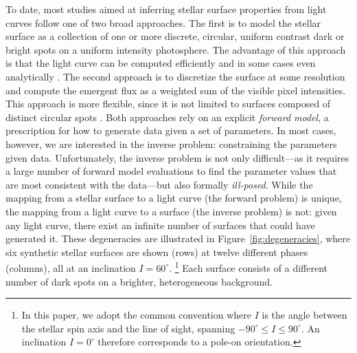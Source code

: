 \documentclass[modern,linenumbers]{aastex62}
\begin{document}
To date, most studies aimed at inferring stellar surface
properties from light curves follow one of two broad approaches. The
first is to model the stellar surface as a collection of one or more
discrete, circular, uniform contrast dark or bright spots on a uniform
intensity photosphere.
The advantage of this approach is that
the light curve can be computed efficiently and in some cases even
analytically \citep[e.g.,][]{Davenport2015,Morris2017,Morris2020b}.
%
The second approach is to discretize the surface at some resolution
and compute the emergent flux as a weighted sum of the visible pixel intensities.
This approach is more flexible, since it is not limited to surfaces
composed of distinct circular spots \citep[e.g.,][]{Harmon2000,Roettenbacher2017}.
%
Both approaches rely on an explicit \emph{forward model}, a prescription for
how to generate data given a set of parameters. In most cases, however, we are interested
in the inverse problem: constraining the parameters given data.
%
Unfortunately, the inverse problem is not only difficult---as it requires
a large number of forward model evaluations to find the parameter values
that are most consistent with the
data---but also formally \emph{ill-posed}.
%
While the mapping from a stellar surface to a light curve (the forward
problem) is unique, the mapping from a light curve to a surface
(the inverse problem) is not:
given any light curve, there exist an infinite number of surfaces that
could have generated it. These degeneracies are illustrated in
Figure~\ref{fig:degeneracies}, where six synthetic stellar surfaces
are shown (rows) at twelve different phases (columns), all at an
inclination $I=60^\circ$.%
\footnote{
    In this paper, we adopt the common convention where $I$ is the angle
    between the stellar spin axis and the line of sight,
    spanning $-90^\circ \leq I \leq 90^\circ$. An inclination $I=0^\circ$ therefore
    corresponds to a pole-on orientation.
}
Each surface
consists of a different number of dark spots on a brighter, heterogeneous
background.
\end{document}
